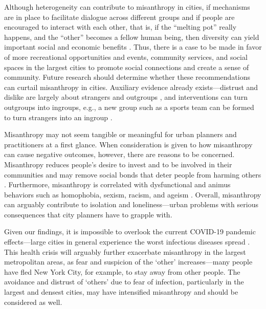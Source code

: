 \documentclass[11pt, letterpaper]{article}
\begin{document}
\begin{spacing}{1.4}
Although heterogeneity can contribute to misanthropy in cities, if mechanisms
are in place to facilitate dialogue across different groups and if people are
encouraged to interact with each other, that is, if the ``melting pot'' really
happens, and the ``other'' becomes a fellow human being, then diversity can
yield important social and economic benefits \citep{rodriguez2019does}.  
Thus, there is a case to be made in favor of more recreational opportunities and events, community services, and social spaces in the largest cities to promote social connections and create a sense of community.  Future research should determine whether these recommendations can curtail misanthropy in
cities. Auxiliary evidence already exists---distrust and dislike are largely about strangers and outgroups \citep{wilson85, delhey11}, and interventions can turn outgroups into ingroups, e.g., a new group such as a sports team can be formed to turn strangers into an ingroup  \citep[e.g.,][]{smith10}.
 
Misanthropy may not seem tangible or meaningful for urban planners and practitioners at a first glance.  When consideration is given to how misanthropy can cause negative outcomes, however, there are reasons to be concerned. Misanthropy reduces people's desire to invest and to be involved in their communities and may remove social bonds that deter people from harming others \citep{weaver2006,hirschi1993,fafchamps2006,walters2013}. Furthermore, misanthropy is correlated with dysfunctional and animus behaviors such as
 homophobia, sexism, racism, and ageism \citep{cattacin2006}. Overall, misanthropy can arguably contribute to isolation and loneliness---urban problems with serious consequences that city planners have to grapple with. 
 
Given our findings, it is impossible to overlook the current COVID-19 pandemic effects---large cities in general experience the worst infectious diseases spread \citep{bettencourt10}. This health crisis will arguably further exacerbate misanthropy in the largest metropolitan areas, as fear and suspicion of the `other' increases---many people have fled New York City, for example, to stay away from other people. The avoidance and distrust of `others' due to fear of infection, particularly in the largest and densest cities, may have intensified misanthropy and should be considered as well. 



\end{spacing}
\end{document}
